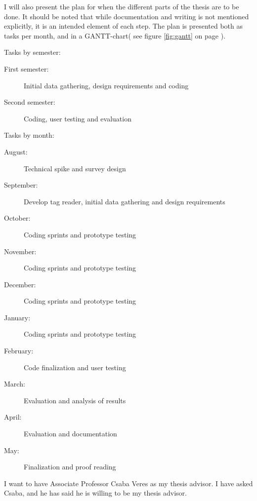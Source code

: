 I will also present the plan for when the different parts of the thesis are to be done. 
It should be noted that while documentation and writing is not mentioned explicitly, it is an intended element of each step.
The plan is presented both as tasks per month, and in a GANTT-chart( see figure \ref{fig:gantt} on page \pageref{fig:gantt}). 

Tasks by semester:
\begin{description}
    \item[First semester: ] Initial data gathering, design requirements and coding
    \item[Second semester: ] Coding, user testing and evaluation
\end{description}

Tasks by month:
\begin{description}
    \item[August: ] Technical spike and survey design
    \item[September: ] Develop tag reader, initial data gathering and design requirements
    \item[October: ] Coding sprints and prototype testing
    \item[November: ] Coding sprints and prototype testing
    \item[December: ] Coding sprints and prototype testing
    \item[January: ] Coding sprints and prototype testing
    \item[February: ] Code finalization and user testing
    \item[March: ]  Evaluation and analysis of results
    \item[April: ] Evaluation and documentation
    \item[May: ] Finalization and proof reading
\end{description}

I want to have Associate Professor Csaba Veres as my thesis advisor. 
I have asked Csaba, and he has said he is willing to be my thesis advisor.

